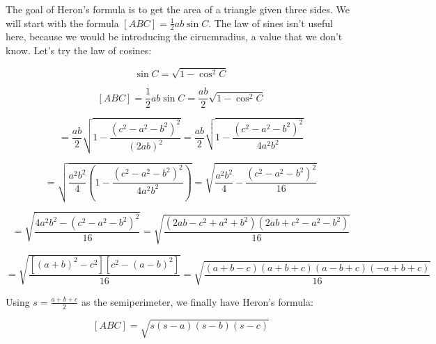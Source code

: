 \documentclass[10pt,a4paper]{article}
\begin{document}
	The goal of Heron's formula is to get the area of a triangle given three sides. We will start with the formula $[ABC] = \frac{1}{2}ab \sin C$. The law of sines isn't useful here, because we would be introducing the cirucmradius, a value that we don't know. Let's try the law of cosines:
	
	$$
	\sin C = \sqrt{1 - \cos^2 C}
	$$
	
	$$
	[ABC] = \frac{1}{2} ab \sin C = \frac{ab}{2} \sqrt{1-\cos^2 C}
	$$
	
	$$
	= \frac{ab}{2} \sqrt{1-\frac{(c^2-a^2-b^2)^2}{(2ab)^2}} = \frac{ab}{2} \sqrt{1 -\frac{(c^2-a^2-b^2)^2}{4a^2b^2}}
	$$
	
	$$
	= \sqrt{\frac{a^2b^2}{4} \left( 1 - \frac{(c^2-a^2-b^2)^2}{4a^2b^2} \right)} = \sqrt{\frac{a^2b^2}{4} - \frac{(c^2-a^2-b^2)^2}{16}}
	$$
	
	$$
	= \sqrt{\frac{4a^2b^2 - (c^2-a^2-b^2)^2}{16}} = \sqrt{\frac{(2ab-c^2+a^2+b^2)(2ab+c^2-a^2-b^2)}{16}}
	$$
	
	$$
	=\sqrt{\frac{[(a+b)^2-c^2][c^2-(a-b)^2]}{16}} = \sqrt{\frac{(a+b-c)(a+b+c)(a-b+c)(-a+b+c)}{16}}
	$$
	
	Using $s = \frac{a+b+c}{2}$ as the semiperimeter, we finally have Heron's formula:
	
	$$
	[ABC] = \sqrt{s(s-a)(s-b)(s-c)}
	$$
	
	
\end{document}
